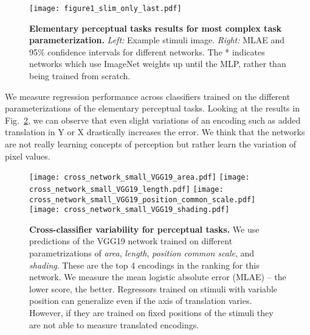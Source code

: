 \begin{figure}[!ht]
	\centering
	\texttt{[image: figure1\_slim\_only\_last.pdf]}
	\caption{\textbf{Elementary perceptual tasks results for most complex task parameterization.} \emph{Left:} Example stimuli image. \emph{Right:} MLAE and 95\% confidence intervals for different networks. The * indicates networks which use ImageNet weights up until the MLP, rather than being trained from scratch.}
	\label{fig:figure1_results}
\end{figure}

 We measure regression performance across classifiers trained on the different parameterizations of the elementary perceptual tasks. Looking at the results in Fig.~\ref{fig:cross_network}, we can observe that even slight variations of an encoding such as added translation in Y or X drastically increases the error. We think that the networks are not really learning concepts of perception but rather learn the variation of pixel values.

\begin{figure}[!ht]
	\centering
	  \texttt{[image: cross\_network\_small\_VGG19\_area.pdf]}
	  \texttt{[image: cross\_network\_small\_VGG19\_length.pdf]}
	  \texttt{[image: cross\_network\_small\_VGG19\_position\_common\_scale.pdf]}
	  \texttt{[image: cross\_network\_small\_VGG19\_shading.pdf]}
  \caption{\textbf{Cross-classifier variability for perceptual tasks.} We use predictions of the VGG19 network trained on different parametrizations of \emph{area}, \emph{length}, \emph{position common scale}, and \emph{shading}. These are the top 4 encodings in the ranking for this network. We measure the mean logistic absolute error (MLAE) -- the lower score, the better. Regressors trained on stimuli with variable position can generalize even if the axis of translation varies. However, if they are trained on fixed positions of the stimuli they are not able to measure translated encodings.}
	\label{fig:cross_network}
\end{figure}

